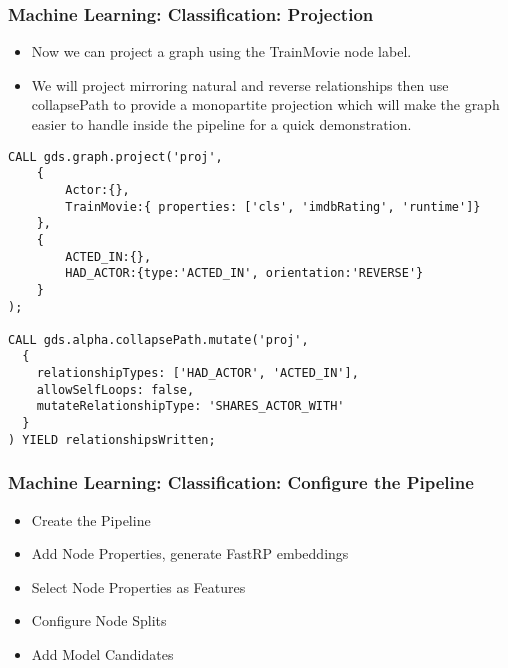 \begin{frame}[fragile]\frametitle{Machine Learning: Classification: Projection}

\begin{itemize}
\item Now we can project a graph using the TrainMovie node label. 
\item We will project mirroring natural and reverse relationships then use collapsePath to provide a monopartite projection which will make the graph easier to handle inside the pipeline for a quick demonstration.
\end{itemize}

\begin{lstlisting}
CALL gds.graph.project('proj',
    {
        Actor:{},
        TrainMovie:{ properties: ['cls', 'imdbRating', 'runtime']}
    },
    {
        ACTED_IN:{},
        HAD_ACTOR:{type:'ACTED_IN', orientation:'REVERSE'}
    }
);

CALL gds.alpha.collapsePath.mutate('proj',
  {
    relationshipTypes: ['HAD_ACTOR', 'ACTED_IN'],
    allowSelfLoops: false,
    mutateRelationshipType: 'SHARES_ACTOR_WITH'
  }
) YIELD relationshipsWritten;
\end{lstlisting}
\end{frame}

\begin{frame}[fragile]\frametitle{Machine Learning: Classification: Configure the Pipeline}

\begin{itemize}
\item Create the Pipeline
\item Add Node Properties, generate FastRP embeddings
\item Select Node Properties as Features
\item Configure Node Splits
\item Add Model Candidates
\end{itemize}

\end{frame}

